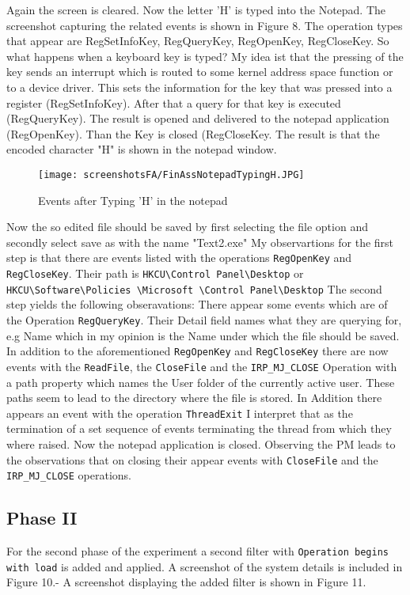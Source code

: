 \documentclass{Gharaei}
\begin{document}
Again the screen is cleared. 
Now the letter 'H' is typed into the Notepad. The screenshot capturing the related events is shown in Figure 8. The operation types that appear are RegSetInfoKey, RegQueryKey, RegOpenKey, RegCloseKey.
So what happens when a keyboard key is typed? My idea ist that the pressing of the key sends an interrupt which is routed to some kernel address space function or to a device driver. This sets the information for the key that was pressed into a register (RegSetInfoKey). After that a query for that key is executed (RegQueryKey). The result is opened and delivered to the notepad application (RegOpenKey). Than the Key is closed (RegCloseKey. The result is that the encoded character "H" is shown in the notepad window. 
\begin{figure}
    \centering
\texttt{[image: screenshotsFA/FinAssNotepadTypingH.JPG]}
\caption{Events after Typing 'H' in the notepad}
\end{figure}
Now the so edited file should be saved by first selecting the file option and secondly select save as with the name "Text2.exe"
My observartions  for the first step is that there are events listed with the operations \texttt{RegOpenKey} and \texttt{RegCloseKey}. Their path is \texttt{HKCU\textbackslash Control Panel\textbackslash Desktop} or \texttt{HKCU\textbackslash Software\textbackslash Policies \textbackslash Microsoft \textbackslash Control Panel\textbackslash Desktop}
The second step yields the following obseravations:
 There appear some events which are of the Operation \texttt{RegQueryKey}. Their Detail field names what they are querying for, e.g Name which in my opinion is the Name under which the file should be saved. 
In addition to the aforementioned \texttt{RegOpenKey} and \texttt{RegCloseKey} there are now events with the \texttt{ReadFile}, the \texttt{CloseFile} and the \texttt{IRP\_MJ\_CLOSE} Operation with a path property which names the User folder of the currently active user. These paths seem to lead to the directory where the file is stored. In Addition there appears an event with the operation \texttt{ThreadExit} I interpret that as the termination of a set sequence of events terminating the thread from which they where raised.
Now the notepad application is closed. Observing the PM leads to the observations that 
on closing their appear events with  \texttt{CloseFile} and the \texttt{IRP\_MJ\_CLOSE}  operations.
\subsection{Phase II}
For the second phase of the experiment 
 a second filter with \texttt{Operation begins with load} is added and applied. A screenshot of the system details is included in Figure 10.- A screenshot displaying the added filter is shown in Figure 11.
\end{document}
